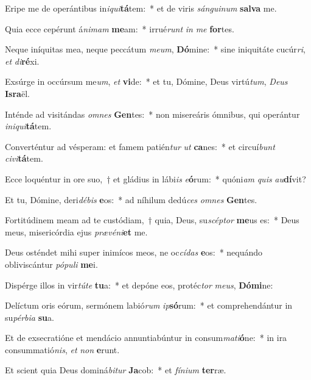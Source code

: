 \item Eripe me de operántibus in\textit{i}\textit{qui}\textbf{tá}tem:~* et de viris \textit{sán}\textit{gui}\textit{num} \textbf{sal}\textbf{va} me.
\item Quia ecce cepérunt á\textit{ni}\textit{mam} \textbf{me}am:~* irrué\textit{runt} \textit{in} \textit{me} \textbf{for}tes.
\item Neque iníquitas mea, neque peccátum \textit{me}\textit{um}, \textbf{Dó}mine:~* sine iniquitáte cucúr\textit{ri}, \textit{et} \textit{di}\textbf{ré}xi.
\item Exsúrge in occúrsum me\textit{um}, \textit{et} \textbf{vi}de:~* et tu, Dómine, Deus virtú\textit{tum}, \textit{De}\textit{us} \textbf{Is}\textbf{ra}ël.
\item Inténde ad visitándas \textit{om}\textit{nes} \textbf{Gen}tes:~* non misereáris ómnibus, qui operántur \textit{in}\textit{i}\textit{qui}\textbf{tá}tem.
\item Converténtur ad vésperam: et famem patién\textit{tur} \textit{ut} \textbf{ca}nes:~* et circuí\textit{bunt} \textit{ci}\textit{vi}\textbf{tá}tem.
\item Ecce loquéntur in ore suo,~† et gládius in lábi\textit{is} \textit{e}\textbf{ó}rum:~* quóni\textit{am} \textit{quis} \textit{au}\textbf{dí}vit?
\item Et tu, Dómine, deri\textit{dé}\textit{bis} \textbf{e}os:~* ad níhilum dedú\textit{ces} \textit{om}\textit{nes} \textbf{Gen}tes.
\item Fortitúdinem meam ad te custódiam,~† quia, Deus, su\textit{scép}\textit{tor} \textbf{me}us es:~* Deus meus, misericórdia ejus \textit{præ}\textit{vé}\textit{ni}\textbf{et} me.
\item Deus osténdet mihi super inimícos meos, ne oc\textit{cí}\textit{das} \textbf{e}os:~* nequándo obliviscántur \textit{pó}\textit{pu}\textit{li} \textbf{me}i.
\item Dispérge illos in vir\textit{tú}\textit{te} \textbf{tu}a:~* et depóne eos, protéc\textit{tor} \textit{me}\textit{us}, \textbf{Dó}\textbf{mi}ne:
\item Delíctum oris eórum, sermónem labió\textit{rum} \textit{ip}\textbf{só}rum:~* et comprehendántur in su\textit{pér}\textit{bi}\textit{a} \textbf{su}a.
\item Et de exsecratióne et mendácio annuntiabúntur in consum\textit{ma}\textit{ti}\textbf{ó}ne:~* in ira consummatió\textit{nis}, \textit{et} \textit{non} \textbf{e}runt.
\item Et scient quia Deus dominá\textit{bi}\textit{tur} \textbf{Ja}cob:~* et \textit{fí}\textit{ni}\textit{um} \textbf{ter}ræ.
